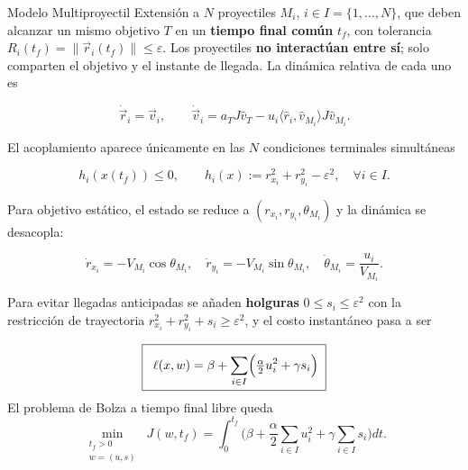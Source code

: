 \begin{block}{Modelo Multiproyectil}
	Extensión a $N$ proyectiles $M_i$, $i\in I=\{1,\dots,N\}$, que deben 
	alcanzar un mismo objetivo $T$ en un \textbf{tiempo final común} $t_f$, 
	con tolerancia $R_i(t_f)=\lVert\vec r_i(t_f)\rVert\le\varepsilon$. 
	Los proyectiles \textbf{no interactúan entre sí}; solo comparten el 
	objetivo y el instante de llegada. La dinámica relativa de cada uno es

	\vspace{-1cm}
	$$
	\dot{\vec r}_i=\vec v_i,\qquad
	\dot{\vec v}_i=a_TJ\hat v_T-u_i\langle\hat r_i,\hat v_{M_i}\rangle J\hat v_{M_i}.
	$$

	El acoplamiento aparece únicamente en las $N$ condiciones terminales 
	simultáneas
	
	\vspace{-0.9cm}
	$$
	h_i(x(t_f))\le0,\qquad h_i(x):=r_{x_i}^2+r_{y_i}^2-\varepsilon^2,
	\quad\forall i\in I.
	$$

	\vspace{0.5cm}
	\begin{exampleblock}{}
	Para objetivo estático, el estado se reduce a $(r_{x_i},r_{y_i},\theta_{M_i})$ 
	y la dinámica se desacopla:

	$$
	\dot r_{x_i}=-V_{M_i}\cos\theta_{M_i},\quad
	\dot r_{y_i}=-V_{M_i}\sin\theta_{M_i},\quad
	\dot\theta_{M_i}=\frac{u_i}{V_{M_i}}.
	$$

	Para evitar llegadas anticipadas se añaden \textbf{holguras} 
	$0\le s_i\le\varepsilon^2$ con la restricción de trayectoria
	$r_{x_i}^2+r_{y_i}^2+s_i\ge\varepsilon^2$, y el costo instantáneo pasa a ser
	
	$$
	\boxed{\;\vphantom{\frac{\frac{A}{B}}{\frac{C}{D}}}\;
	\ell(x,w)=\beta+\sum_{i\in I}\!\Big(\tfrac{\alpha}{2}u_i^2+\gamma s_i\Big)\;}
	$$
	El problema de Bolza a tiempo final libre queda
	$$
	\min_{\substack{t_f>0\\w=(u,s)}}\;
	J(w,t_f)=\int_0^{t_f}\!\Big(\beta+\frac{\alpha}{2}\sum_{i\in I}u_i^2
	+\gamma\sum_{i\in I}s_i\Big)dt.
	$$
	\end{exampleblock}

	{\def\marginimagetop{-2}
	}

\end{block}

